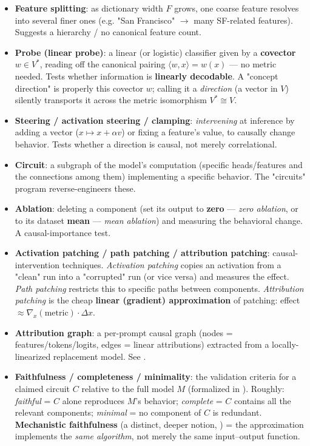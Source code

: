 \begin{itemize}
\item \textbf{Feature splitting}: as dictionary width $F$ grows, one coarse feature resolves into several finer ones (e.g. "San Francisco" $\to$ many SF-related features). Suggests a hierarchy / no canonical feature count.
\item \textbf{Probe (linear probe)}: a linear (or logistic) classifier given by a \textbf{covector} $w\in V^{*}$, reading off the canonical pairing $\langle w, x\rangle = w(x)$ --- no metric needed. Tests whether information is \textbf{linearly decodable}. A "concept direction" is properly this covector $w$; calling it a \emph{direction} (a vector in $V$) silently transports it across the metric isomorphism $V^{*}\cong V$.
\item \textbf{Steering / activation steering / clamping}: \emph{intervening} at inference by adding a vector ($x \mapsto x + \alpha v$) or fixing a feature's value, to causally change behavior. Tests whether a direction is causal, not merely correlational.
\item \textbf{Circuit}: a subgraph of the model's computation (specific heads/features and the connections among them) implementing a specific behavior. The "circuits" program reverse-engineers these.
\item \textbf{Ablation}: deleting a component (set its output to \textbf{zero} --- \emph{zero ablation}, or to its dataset \textbf{mean} --- \emph{mean ablation}) and measuring the behavioral change. A causal-importance test.
\item \textbf{Activation patching / path patching / attribution patching}: causal-intervention techniques. \emph{Activation patching} copies an activation from a "clean" run into a "corrupted" run (or vice versa) and measures the effect. \emph{Path patching} restricts this to specific paths between components. \emph{Attribution patching} is the cheap \textbf{linear (gradient) approximation} of patching: effect $\approx \nabla_x(\text{metric})\cdot \Delta x$.
\item \textbf{Attribution graph}: a per-prompt causal graph (nodes = features/tokens/logits, edges = linear attributions) extracted from a locally-linearized replacement model. See \textcite{circuit-tracing-computational-graphs,on-the-biology-of-a-large-language-model}.
\item \textbf{Faithfulness / completeness / minimality}: the validation criteria for a claimed circuit $C$ relative to the full model $M$ (formalized in \textcite{interpretability-in-the-wild-ioi}). Roughly: \emph{faithful} = $C$ alone reproduces $M$'s behavior; \emph{complete} = $C$ contains all the relevant components; \emph{minimal} = no component of $C$ is redundant. \textbf{Mechanistic faithfulness} (a distinct, deeper notion, \textcite{toy-model-of-mechanistic-unfaithfulness}) = the approximation implements the \emph{same algorithm}, not merely the same input--output function.

\end{itemize}
